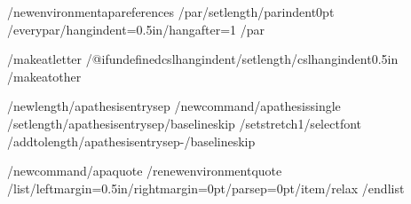 /newenvironment{apareferences}
  {/par/setlength{/parindent}{0pt}%
   /everypar{/hangindent=0.5in/hangafter=1}}
  {/par}

/makeatletter
/@ifundefined{cslhangindent}{}{/setlength{/cslhangindent}{0.5in}}
/makeatother


%
/newlength{/apathesisentrysep}
/newcommand{/apathesissingle}{%
  /setlength{/apathesisentrysep}{/baselineskip}%
  /setstretch{1}/selectfont
  /addtolength{/apathesisentrysep}{-/baselineskip}}

%
/newcommand{/apaquote}{%
  /renewenvironment{quote}
    {/list{}{/leftmargin=0.5in/rightmargin=0pt/parsep=0pt}/item/relax}
    {/endlist}}

